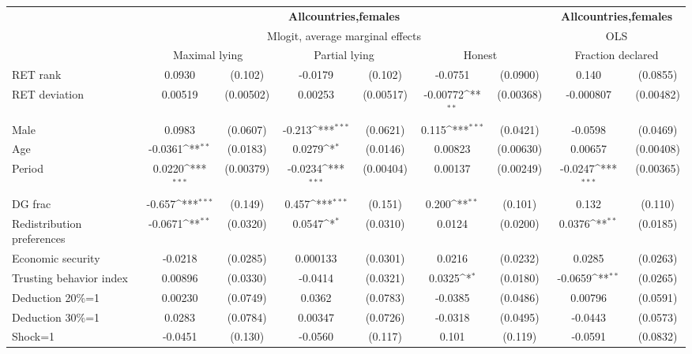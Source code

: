 \def\sym#1{\ifmmode^{#1}\else\(^{#1}\)\fi}
\begin{tabular}{l|cccccc|cc}
\hline\hline
&\multicolumn{6}{c|}{\bf All\space{}countries,\space{}females}&\multicolumn{2}{c}{\bf All\space{}countries,\space{}females}\\ &\multicolumn{6}{c|}{Mlogit, average marginal effects }&\multicolumn{2}{c}{OLS}\\
                &\multicolumn{2}{c}{Maximal lying}&\multicolumn{2}{c}{Partial lying}&\multicolumn{2}{c}{Honest}  &\multicolumn{2}{c}{Fraction declared}\\
\hline
RET rank        &   0.0930         &  (0.102)&  -0.0179         &  (0.102)&  -0.0751         & (0.0900)&    0.140         & (0.0855)\\
RET deviation   &  0.00519         &(0.00502)&  0.00253         &(0.00517)& -0.00772\sym{**} &(0.00368)&-0.000807         &(0.00482)\\
Male            &   0.0983         & (0.0607)&   -0.213\sym{***}& (0.0621)&    0.115\sym{***}& (0.0421)&  -0.0598         & (0.0469)\\
Age             &  -0.0361\sym{**} & (0.0183)&   0.0279\sym{*}  & (0.0146)&  0.00823         &(0.00630)&  0.00657         &(0.00408)\\
Period          &   0.0220\sym{***}&(0.00379)&  -0.0234\sym{***}&(0.00404)&  0.00137         &(0.00249)&  -0.0247\sym{***}&(0.00365)\\
DG frac         &   -0.657\sym{***}&  (0.149)&    0.457\sym{***}&  (0.151)&    0.200\sym{**} &  (0.101)&    0.132         &  (0.110)\\
Redistribution preferences&  -0.0671\sym{**} & (0.0320)&   0.0547\sym{*}  & (0.0310)&   0.0124         & (0.0200)&   0.0376\sym{**} & (0.0185)\\
Economic security&  -0.0218         & (0.0285)& 0.000133         & (0.0301)&   0.0216         & (0.0232)&   0.0285         & (0.0263)\\
Trusting behavior index&  0.00896         & (0.0330)&  -0.0414         & (0.0321)&   0.0325\sym{*}  & (0.0180)&  -0.0659\sym{**} & (0.0265)\\
Deduction 20\%=1&  0.00230         & (0.0749)&   0.0362         & (0.0783)&  -0.0385         & (0.0486)&  0.00796         & (0.0591)\\
Deduction 30\%=1&   0.0283         & (0.0784)&  0.00347         & (0.0726)&  -0.0318         & (0.0495)&  -0.0443         & (0.0573)\\
Shock=1         &  -0.0451         &  (0.130)&  -0.0560         &  (0.117)&    0.101         &  (0.119)&  -0.0591         & (0.0832)\\

\end{tabular}
